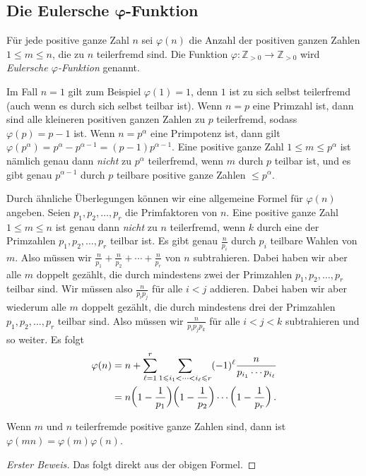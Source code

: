 \subsection*{Die Eulersche $\boldsymbol{\varphi}$-Funktion}
\begin{definition}
	Für jede positive ganze Zahl $n$ sei $\varphi(n)$ die Anzahl der positiven ganzen Zahlen $1\leqslant m\leqslant n$, die zu $n$ teilerfremd sind. Die Funktion $\varphi\colon \mathbb Z_{>0}\rightarrow \mathbb Z_{>0}$ wird \emph{Eulersche $\varphi$-Funktion} genannt.
\end{definition}
Im Fall $n=1$ gilt zum Beispiel $\varphi(1)=1$, denn $1$ ist zu sich selbst teilerfremd (auch wenn es durch sich selbst teilbar ist). Wenn $n=p$ eine Primzahl ist, dann sind alle kleineren positiven ganzen Zahlen zu $p$ teilerfremd, sodass $\varphi(p)=p-1$ ist. Wenn $n=p^\alpha$ eine Primpotenz ist, dann gilt $\varphi(p^\alpha)=p^\alpha-p^{\alpha-1}=(p-1)p^{\alpha-1}$. Eine positive ganze Zahl $1\leqslant m\leqslant p^\alpha$ ist nämlich genau dann \emph{nicht} zu $p^\alpha$ teilerfremd, wenn $m$ durch $p$ teilbar ist, und es gibt genau $p^{\alpha-1}$ durch $p$ teilbare positive ganze Zahlen $\leqslant p^\alpha$.

Durch ähnliche Überlegungen können wir eine allgemeine Formel für $\varphi(n)$ angeben. Seien $p_1,p_2,\dotsc,p_r$ die Primfaktoren von $n$. Eine positive ganze Zahl $1\leqslant m\leqslant n$ ist genau dann \emph{nicht} zu $n$ teilerfremd, wenn $k$ durch eine der Primzahlen $p_1,p_2,\dotsc,p_r$ teilbar ist. Es gibt genau $\frac{n}{p_i}$ durch $p_i$ teilbare Wahlen von $m$. Also müssen wir $\frac{n}{p_1}+\frac{n}{p_2}+\dotsb+\frac{n}{p_r}$ von $n$ subtrahieren. Dabei haben wir aber alle $m$ doppelt gezählt, die durch mindestens zwei der Primzahlen $p_1,p_2,\dotsc,p_r$ teilbar sind. Wir müssen also $\frac{n}{p_ip_j}$ für alle $i<j$ addieren. Dabei haben wir aber wiederum alle $m$ doppelt gezählt, die durch mindestens drei der Primzahlen $p_1,p_2,\dotsc,p_r$ teilbar sind. Also müssen wir $\frac{n}{p_ip_jp_k}$ für alle $i<j<k$ subtrahieren und so weiter. Es folgt
\begin{align*}
	\varphi(n)&=n+\sum_{\ell=1}^r\sum_{1\leqslant i_1<\dotsb<i_\ell\leqslant r}(-1)^\ell\frac{n}{p_{i_1}\dotsm p_{i_\ell}}\\
	&=n\parens*{1-\frac 1{p_1}}\parens*{1-\frac 1{p_2}}\dotsm \parens*{1-\frac 1{p_r}}\,.
\end{align*}
\begin{satzmitnamen}[Lemma]
	Wenn $m$ und $n$ teilerfremde positive ganze Zahlen sind, dann ist $\varphi(mn)=\varphi(m)\varphi(n)$.
\end{satzmitnamen}
\begin{proof}[Erster Beweis]
	Das folgt direkt aus der obigen Formel.
\end{proof}

